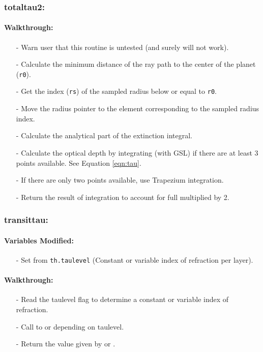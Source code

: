 \documentclass[letterpaper,12pt]{article}
\begin{document}
\subsubsection{totaltau2:}
\paragraph{Walkthrough:}
\begin{enumerate}[leftmargin=10pt, noitemsep, parsep=0pt, topsep=0ex]
\item[-] Warn user that this routine is untested (and surely will not work).
\item[-] Calculate the minimum distance of the ray path to the center
  of the planet ({\tt r0}).
\item[-] Get the index ({\tt rs}) of the sampled radius below or equal
  to {\tt r0}.
\item[-] Move the radius pointer to the element corresponding to the
  sampled radius index.
\item[-] Calculate the analytical part of the extinction integral.
\item[-] Calculate the optical depth by integrating (with GSL) if
  there are at least 3 points available. See Equation \ref{eqn:tau}. 
\item[-] If there are only two points available, use Trapezium integration.
\item[-] Return the result of integration to account for full
 multiplied by 2.
\end{enumerate}


\subsubsection{transittau:}
\paragraph{Variables Modified:}
\begin{enumerate}[leftmargin=10pt, noitemsep, parsep=0pt, topsep=0ex]
\item[-] Set  from {\tt th.taulevel} (Constant or
  variable index of refraction per layer).
\end{enumerate}

\paragraph{Walkthrough:}
\begin{enumerate}[leftmargin=10pt, noitemsep, parsep=0pt, topsep=0ex]
\item[-] Read the taulevel flag to determine a constant or variable
  index of refraction.
\item[-] Call to  or  depending on
  taulevel.
\item[-] Return the value given by  or .
\end{enumerate}
\end{document}
